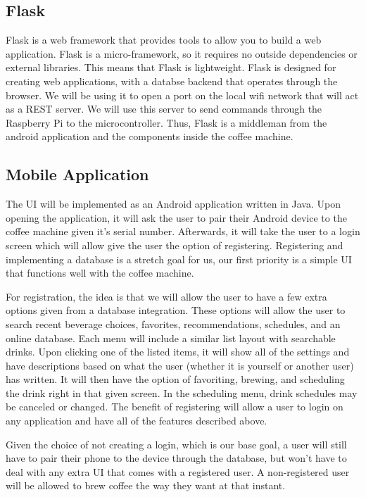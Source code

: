 \documentclass[conference]{IEEEtran}
\begin{document}
\subsection{Flask}
Flask is a web framework that provides tools to allow you to build a web application.
Flask is a micro-framework, so it requires no outside dependencies or external libraries.
This means that Flask is lightweight. Flask is designed for creating web applications,
with a databse backend that operates through the browser. We will be using it to open
a port on the local wifi network that will act as a REST server. We will use this server to send
commands through the Raspberry Pi to the microcontroller. Thus, Flask is a middleman from the 
android application and the components inside the coffee machine.

\subsection{Mobile Application}
The UI will be implemented as an Android application written in Java. Upon
opening the application, it will ask the user to pair their Android device to
the coffee machine given it's serial number. Afterwards, it will take the user
to a login screen which will allow give the user the option of registering.
Registering and implementing a database is a stretch goal for us, our first priority is a simple UI that functions well with the coffee machine. 

For registration, the idea is that we will allow the user to have a few extra options given from a database
integration. These options will allow the user to search recent beverage
choices, favorites, recommendations, schedules, and an online database. Each
menu will include a similar list layout with searchable drinks. Upon clicking
one of the listed items, it will show all of the settings and have descriptions
based on what the user (whether it is yourself or another user) has written. It
will then have the option of favoriting, brewing, and scheduling the drink
right in that given screen. In the scheduling menu, drink schedules may be
canceled or changed. The benefit of registering will allow a user to login on
any application and have all of the features described above.

Given the choice of not creating a login, which is our base goal, a user will still have to pair their
phone to the device through the database, but won't have to deal with any extra
UI that comes with a registered user. A non-registered user will be allowed to
brew coffee the way they want at that instant. 
\end{document}
